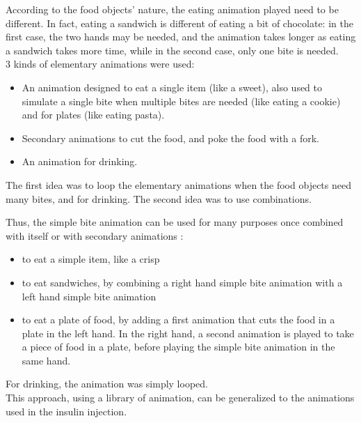 \begin{itemize}
\begin{itemize}
{According to the food objects' nature, the eating animation played need to be different. In fact, eating a sandwich is different of eating a bit of chocolate: in the first case, the two hands may be needed, and the animation takes longer as eating a sandwich takes more time, while in the second case, only one bite is needed.\\

3 kinds of elementary animations were used: 
\begin{itemize}
\item An animation designed to eat a single item (like a sweet), also used to simulate a single bite when multiple bites are needed (like eating a cookie) and for plates (like eating pasta).
\item Secondary animations to cut the food, and poke the food with a fork.
\item An animation for drinking.
\end{itemize}
The first idea was to loop the elementary animations when the food objects need many bites, and for drinking. The second idea was to use combinations. 

Thus, the simple bite animation can be used for many purposes once combined with itself or with secondary animations :
\begin{itemize}
\item to eat a simple item, like a crisp
\item to eat sandwiches, by combining a right hand simple bite animation with a left hand simple bite animation
\item to eat a plate of food, by adding a first animation that cuts the food in a plate in the left hand. In the right hand, a second animation is played to take a piece of food in a plate, before playing the simple bite animation in the same hand.
\end{itemize}

For drinking, the animation was simply looped.\\

This approach, using a library of animation, can be generalized to the animations used in the insulin injection.

}
\end{itemize}
\end{itemize}
